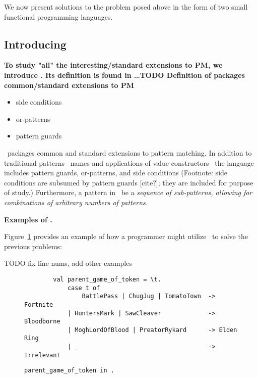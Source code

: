 \documentclass[manuscript,screen,review, 12pt]{acmart}
\begin{document}
We now present solutions to the problem posed above in the form of two small
functional programming languages. %

\subsection{Introducing \PPlus\ }

\begin{outline}[enumerate]
    \1 \bf{To study "all" the interesting/standard extensions to PM, we introduce}
    \PPlus. Its definition is found in \dots TODO 
    \2 \bf{Definition of \PPlus}
    \2 \bf{{\PPlus} packages common/standard extensions to PM}
    \begin{itemize}
        \item side conditions
        \item or-patterns 
        \item pattern guards 
    \end{itemize}

    \PPlus\ packages common and standard extensions to pattern matching. In
    addition to traditional patterns-- names and applications of value
    constructors-- the language includes pattern guards, or-patterns, and side
    conditions (Footnote: side conditions are subsumed by pattern guards
    [cite?]; they are included for purpose of study.) Furthermore, a pattern in
    \PPlus\ be a \it{sequence} of sub-patterns, allowing for combinations of 
    arbitrary numbers of patterns. 
    
    \3 \bf{Examples of \PPlus. }

    Figure~\ref{fig:ppexs} provides an example of how a programmer might utilize
    \PPlus\ to solve the previous problems: 

    TODO fix line nums, add other examples 
    \begin{figure}
        \begin{center}
            \pplst 
            \begin{lstlisting}
        val parent_game_of_token = \t. 
            case t of  
                BattlePass | ChugJug | TomatoTown  -> Fortnite
            | HuntersMark | SawCleaver             -> Bloodborne
            | MoghLordOfBlood | PreatorRykard      -> Elden Ring
            | _                                    -> Irrelevant
        \end{lstlisting}
        \end{center}    
        \caption{\tt{parent\_game\_of\_token} in \PPlus.} 
        \label{fig:ppexs}
        \end{figure}
    

\end{outline}
\end{document}
